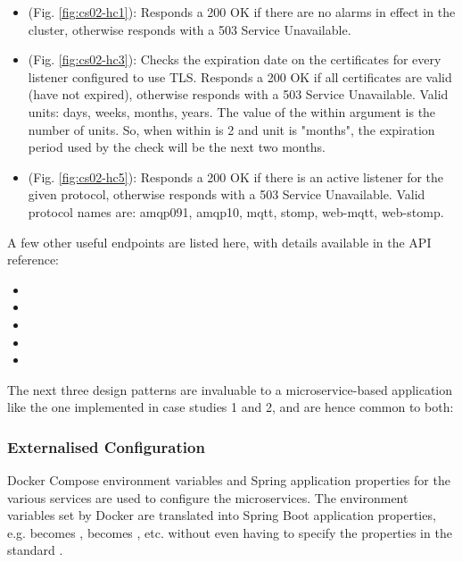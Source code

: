 \begin{itemize}
  \item {} (Fig. \ref{fig:cs02-hc1}): Responds a 200 OK if there are no alarms in effect in the cluster, otherwise responds with a 503 Service Unavailable.
  \item {} (Fig. \ref{fig:cs02-hc3}):  Checks the expiration date on the certificates for every listener configured to use TLS. Responds a 200 OK if all certificates are valid (have not expired), otherwise responds with a 503 Service Unavailable. Valid units: days, weeks, months, years. The value of the within argument is the number of units. So, when within is 2 and unit is "months", the expiration period used by the check will be the next two months.
  \item {} (Fig. \ref{fig:cs02-hc5}): Responds a 200 OK if there is an active listener for the given protocol, otherwise responds with a 503 Service Unavailable. Valid protocol names are: amqp091, amqp10, mqtt, stomp, web-mqtt, web-stomp.
\end{itemize}

A few other useful endpoints are listed here, with details available in the API reference:
\begin{itemize}
  \item {}
  \item {}
  \item {}
  \item {}
  \item {}
\end{itemize}


The next three design patterns are invaluable to a microservice-based application like the one implemented in case studies 1 and 2, and are hence common to both:

\subsubsection{Externalised Configuration}

Docker Compose environment variables and Spring application properties for the various services are used to configure the microservices. The environment variables set by Docker are translated into Spring Boot application properties, e.g.  becomes ,  becomes , etc. without even having to specify the properties in the standard .


